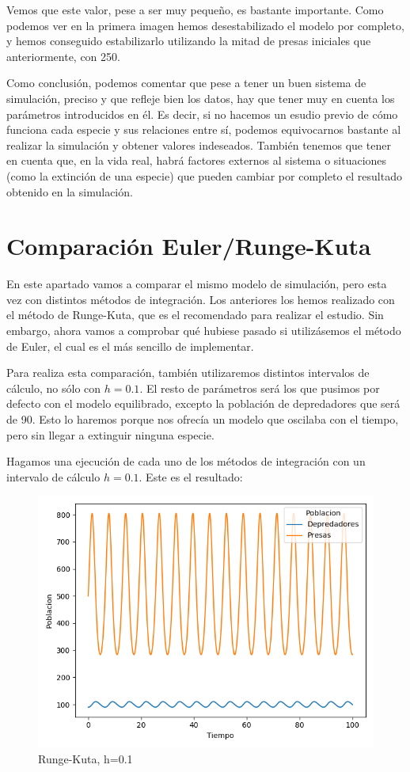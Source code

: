 \documentclass[11pt,a4paper]{article}
\begin{document}
Vemos que este valor, pese a ser muy pequeño, es bastante importante. Como podemos ver en la primera imagen hemos desestabilizado el modelo por completo,
y hemos conseguido estabilizarlo utilizando la mitad de presas iniciales que anteriormente, con 250.

Como conclusión, podemos comentar que pese a tener un buen sistema de simulación, preciso y que refleje bien los datos, hay que tener muy en cuenta
los parámetros introducidos en él. Es decir, si no hacemos un esudio previo de cómo funciona cada especie y sus relaciones entre sí, podemos equivocarnos
bastante al realizar la simulación y obtener valores indeseados. También tenemos que tener en cuenta que, en la vida real, habrá factores externos al
sistema o situaciones (como la extinción de una especie) que pueden cambiar por completo el resultado obtenido en la simulación.


\newpage
\section{Comparación Euler/Runge-Kuta}
En este apartado vamos a comparar el mismo modelo de simulación, pero esta vez con distintos métodos de integración. Los anteriores los hemos realizado
con el método de Runge-Kuta, que es el recomendado para realizar el estudio. Sin embargo, ahora vamos a comprobar qué hubiese pasado si utilizásemos
el método de Euler, el cual es el más sencillo de implementar.

Para realiza esta comparación, también utilizaremos distintos intervalos de cálculo, no sólo con $h=0.1$. El resto de parámetros será los que pusimos por
defecto con el modelo equilibrado, excepto la población de depredadores que será de 90. Esto lo haremos porque nos ofrecía un modelo que oscilaba con el
tiempo, pero sin llegar a extinguir ninguna especie.

Hagamos una ejecución de cada uno de los métodos de integración con un intervalo de cálculo $h=0.1$. Este es el resultado:
\begin{figure}[H]
	\centering
	\includegraphics[scale=0.5]{img/5-rk-90-500.png}
	\caption{Runge-Kuta, h=0.1}
\end{figure}
\end{document}
